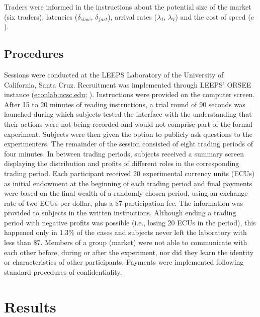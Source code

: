 \documentclass[12pt]{article}
\begin{document}
Traders were informed in the instructions about the potential size of the market (six traders), latencies ($\delta_{slow}$, $\delta_{fast}$), arrival rates ($\lambda_I$, $\lambda_V$) and  the cost of speed ($c$). 

\subsection{Procedures}

Sessions were conducted at the LEEPS Laboratory of the University of California, Santa Cruz. Recruitment was implemented through LEEPS' ORSEE instance (\url{econlab.ucsc.edu}; \cite{Greiner2015}). Instructions were provided on the computer screen. After 15 to 20 minutes of reading instructions, a trial round of 90 seconds was launched during which subjects tested the interface with the understanding that their actions were not being recorded and would not comprise part of the formal experiment. Subjects were then given the option to publicly ask questions to the experimenters. The remainder of the session consisted of eight trading periods of four minutes. 
In between trading periods, subjects received a summary screen displaying the distribution and profits of different roles in the corresponding trading period. Each participant received 20 experimental currency units (ECUs) as initial endowment at the beginning of each trading period and final payments were based on the final wealth of a randomly chosen period, using an exchange rate of two ECUs per dollar, plus a \$7 participation fee. The information was provided to subjects in the written instructions. 
%
Although ending a trading period with negative profits was possible (i.e., losing 20 ECUs in the period), this happened only in 1.3\% of the cases and subjects never left the laboratory with less than \$7.
Members of a group (market) were not able to communicate with each other before, during or after the experiment, nor did they learn the identity or characteristics of other participants. Payments were implemented following standard procedures of confidentiality.


\section{Results \label{Results}}
\end{document}
